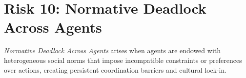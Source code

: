 \documentclass[11pt, letterpaper, shortlabels]{berkeley}
\begin{document}
{%






\section{Risk 10: Normative Deadlock Across Agents}
\label{sec:social-norms}


\begin{boxE}
\textit{Normative Deadlock Across Agents} arises when agents are endowed with heterogeneous social norms that impose incompatible constraints or preferences over actions, creating persistent coordination barriers and cultural lock-in.


\end{boxE}}
\end{document}
